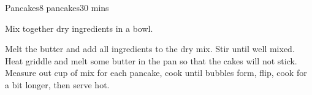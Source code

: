 \begin{recipe}{Pancakes}{8 pancakes}{30 mins}





  Mix together dry ingredients in a bowl.

  


  Melt the butter and add all ingredients to the dry mix.  Stir until well
  mixed.  Heat griddle and melt some butter in the pan so that the cakes will
  not stick.  Measure out  cup of mix for each pancake, cook
  until bubbles form, flip, cook for a bit longer, then serve hot.

\end{recipe}
